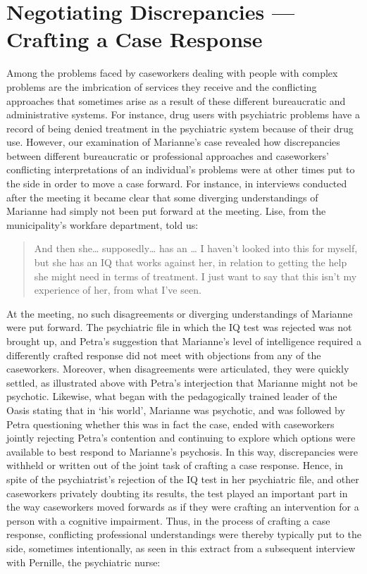 \chapter{Negotiating Discrepancies --- Crafting a Case Response}
Among the problems faced by caseworkers dealing with people with complex problems are the imbrication of services they receive and the conflicting approaches that sometimes arise as a result of these different bureaucratic and administrative systems. For instance, drug users with psychiatric problems have a record of being denied treatment in the psychiatric system because of their drug use. However, our examination of Marianne’s case revealed how discrepancies between different bureaucratic or professional approaches and caseworkers’ conflicting interpretations of an individual’s problems were at other times put to the side in order to move a case forward. For instance, in interviews conducted after the meeting it became clear that some diverging understandings of Marianne had simply not been put forward at the meeting. Lise, from the municipality’s workfare department, told us:
    \blockquote{And then she… supposedly… has an … I haven’t looked into this for myself, but she has an IQ that works against her, in relation to getting the help she might need in terms of treatment. I just want to say that this isn’t my experience of her, from what I’ve seen.}
At the meeting, no such disagreements or diverging understandings of Marianne were put forward. The psychiatric file in which the IQ test was rejected was not brought up, and Petra’s suggestion that Marianne’s level of intelligence required a differently crafted response did not meet with objections from any of the caseworkers. Moreover, when disagreements were articulated, they were quickly settled, as illustrated above with Petra’s interjection that Marianne might not be psychotic. Likewise, what began with the pedagogically trained leader of the Oasis stating that in ‘his world’, Marianne was psychotic, and was followed by Petra questioning whether this was in fact the case, ended with caseworkers jointly rejecting Petra’s contention and continuing to explore which options were available to best respond to Marianne’s psychosis. In this way, discrepancies were withheld or written out of the joint task of crafting a case response. Hence, in spite of the psychiatrist’s rejection of the IQ test in her psychiatric file, and other caseworkers privately doubting its results, the test played an important part in the way caseworkers moved forwards as if they were crafting an intervention for a person with a cognitive impairment. Thus, in the process of crafting a case response, conflicting professional understandings were thereby typically put to the side, sometimes intentionally, as seen in this extract from a subsequent interview with Pernille, the psychiatric nurse:
